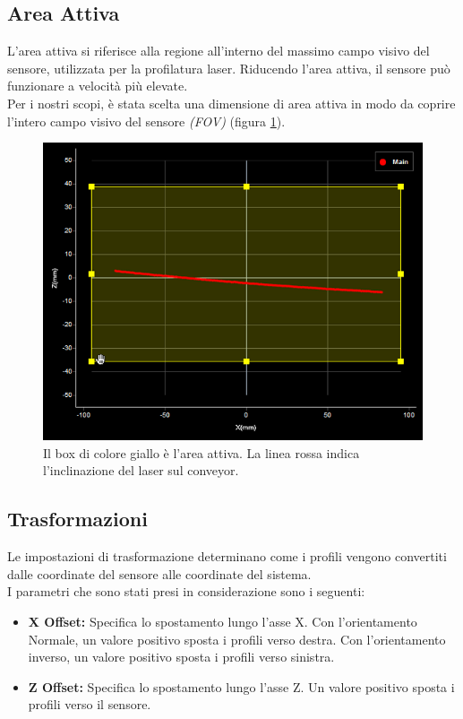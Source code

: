 \subsection{Area Attiva}
L'area attiva si riferisce alla regione all'interno del massimo campo visivo del sensore, utilizzata per la profilatura laser. Riducendo l'area attiva, il sensore può funzionare a velocità più elevate.\\
\newline
Per i nostri scopi, è stata scelta una dimensione di area attiva in modo da coprire l'intero campo visivo del sensore \textit{(FOV)} (figura \ref{fig:active_area}).

\begin{figure}[H]
	\centering
	\includegraphics[width=0.7\columnwidth]{./pictures/active_area.png}
	\caption{Il box di colore giallo è l'area attiva. La linea rossa indica l'inclinazione del laser sul conveyor.}\label{fig:active_area}
\end{figure}

\subsection{Trasformazioni}
Le impostazioni di trasformazione determinano come i profili vengono convertiti dalle coordinate del sensore alle coordinate del sistema.\\
\newline
I parametri che sono stati presi in considerazione sono i seguenti:

\begin{itemize}
	\item \textbf{X Offset:} Specifica lo spostamento lungo l'asse X. Con l'orientamento Normale, un valore positivo sposta i profili verso destra. Con l'orientamento inverso, un valore positivo sposta i profili verso sinistra.
	\item \textbf{Z Offset:} Specifica lo spostamento lungo l'asse Z. Un valore positivo sposta i profili verso il sensore.
\end{itemize}


